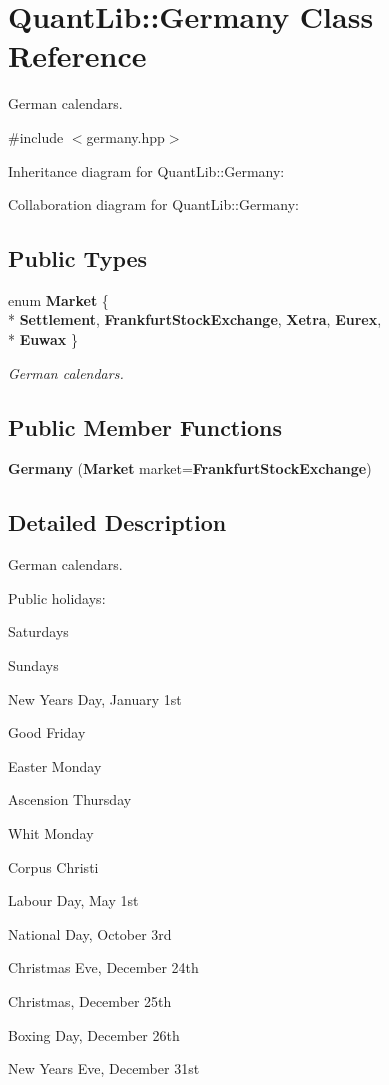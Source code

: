 \section{Quant\+Lib\+:\+:Germany Class Reference}
\label{class_quant_lib_1_1_germany}


German calendars.  




{\ttfamily \#include $<$germany.\+hpp$>$}



Inheritance diagram for Quant\+Lib\+:\+:Germany\+:


Collaboration diagram for Quant\+Lib\+:\+:Germany\+:
\subsection*{Public Types}
\begin{DoxyCompactItemize}
\item 
enum {\bf Market} \{ \\*
{\bf Settlement}, 
{\bf Frankfurt\+Stock\+Exchange}, 
{\bf Xetra}, 
{\bf Eurex}, 
\\*
{\bf Euwax}
 \}\begin{DoxyCompactList}\small\item\em German calendars. \end{DoxyCompactList}
\end{DoxyCompactItemize}
\subsection*{Public Member Functions}
\begin{DoxyCompactItemize}
\item 
{\bf Germany} ({\bf Market} market={\bf Frankfurt\+Stock\+Exchange})
\end{DoxyCompactItemize}


\subsection{Detailed Description}
German calendars. 

Public holidays\+: 
\begin{DoxyItemize}
\item Saturdays 
\item Sundays 
\item New Year\textquotesingle{}s Day, January 1st 
\item Good Friday 
\item Easter Monday 
\item Ascension Thursday 
\item Whit Monday 
\item Corpus Christi 
\item Labour Day, May 1st 
\item National Day, October 3rd 
\item Christmas Eve, December 24th 
\item Christmas, December 25th 
\item Boxing Day, December 26th 
\item New Year\textquotesingle{}s Eve, December 31st 
\end{DoxyItemize}

